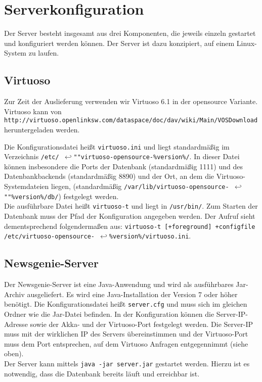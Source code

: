 
\chapter{Serverkonfiguration}

Der Server besteht insgesamt aus drei Komponenten, die jeweils einzeln gestartet und konfiguriert werden können. Der Server ist dazu konzipiert, auf einem Linux-System zu laufen.

\section{Virtuoso}

Zur Zeit der Auslieferung verwenden wir Virtuoso 6.1 in der opensource Variante. 
Virtuoso kann von \texttt{http://virtuoso.openlinksw.com/dataspace/doc/dav/wiki/Main/VOSDownload} heruntergeladen werden.

Die Konfigurationsdatei heißt \texttt{virtuoso.ini} und liegt standardmäßig im Verzeichnis \texttt{/etc/ $\hookleftarrow$""virtuoso-opensource-\%version\%/}.
In dieser Datei können insbesondere die Ports der Datenbank (standardmäßig 1111) und des Datenbankbackends (standardmäßig 8890) und der Ort, an dem die Virtuoso-Systemdateien liegen, (standardmäßig \texttt{/var/lib/virtuoso-opensource- $\hookleftarrow$""\%version\%/db/}) festgelegt werden.\\
Die ausführbare Datei heißt \texttt{virtuoso-t} und liegt in \texttt{/usr/bin/}. Zum Starten der Datenbank muss der Pfad der Konfiguration angegeben werden. Der Aufruf sieht dementsprechend folgendermaßen aus: \texttt{virtuoso-t [+foreground] +configfile /etc/virtuoso-opensource-~$\hookleftarrow$\linebreak\%version\%/virtuoso.ini}.

\section{Newsgenie-Server}

Der Newsgenie-Server ist eine Java-Anwendung und wird als ausführbares Jar-Archiv ausgeliefert. Es wird eine Java-Installation der Version 7 oder höher benötigt. Die Konfigurationsdatei heißt \texttt{server.cfg} und muss sich im gleichen Ordner wie die Jar-Datei befinden. In der Konfiguration können die Server-IP-Adresse sowie der Akka- und der Virtuoso-Port festgelegt werden. Die Server-IP muss mit der wirklichen IP des Servers übereinstimmen und der Virtuoso-Port muss dem Port entsprechen, auf dem Virtuoso Anfragen entgegennimmt (siehe oben).\\
Der Server kann mittels \texttt{java -jar server.jar} gestartet werden. Hierzu ist es notwendig, dass die Datenbank bereits läuft und erreichbar ist.

